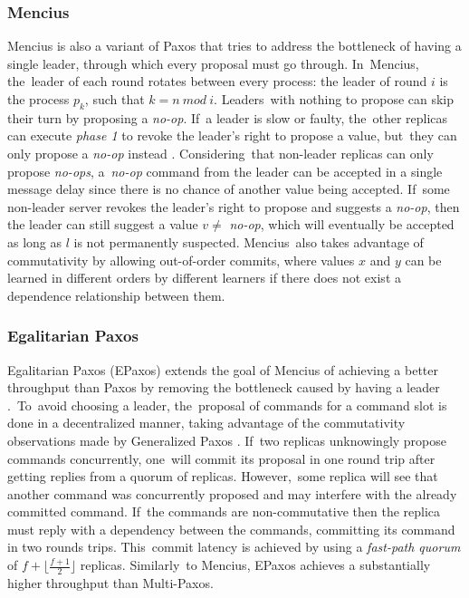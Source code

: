 \documentclass[algorithms,article,accept,moreauthors,pdftex,10pt,a4paper]{Definitions/mdpi}
\begin{document}
\subsubsection{Mencius}
Mencius is also a variant of Paxos that tries to address the bottleneck of having a single leader, through which every proposal must go through. In~Mencius, the~leader of each round rotates between every process: the leader of round $i$ is the process $p_k$, such that $k = n\ mod\ i$. Leaders~with nothing to propose can skip their turn by proposing a \textit{no-op}. If~a leader is slow or faulty, the~other replicas can execute \textit{phase 1} to revoke the leader's right to propose a value, but~they can only propose a \textit{no-op} instead \cite{Mao2008}. Considering~that non-leader replicas can only propose \textit{no-ops}, a~\textit{no-op} command from the leader can be accepted in a single message delay since there is no chance of another value being accepted. If~some non-leader server revokes the leader's right to propose and suggests a \textit{no-op}, then the leader can still suggest a value $v \neq$ \textit{no-op}, which will eventually be accepted as long as $l$ is not permanently suspected. Mencius~also takes advantage of commutativity by allowing out-of-order commits, where values $x$ and $y$ can be learned in different orders by different learners if there does not exist a dependence relationship between them.

\subsubsection{Egalitarian Paxos}
Egalitarian Paxos (EPaxos) extends the goal of Mencius of achieving a better throughput than Paxos by removing the bottleneck caused by having a leader \cite{Moraru2013}.~To~avoid choosing a leader, the~proposal of commands for a command slot is done in a decentralized manner, taking advantage of the commutativity observations made by Generalized Paxos \cite{Lamport2005}. If~two replicas unknowingly propose commands concurrently, one~will commit its proposal in one round trip after getting replies from a quorum of replicas. However,~some replica will see that another command was concurrently proposed and may interfere with the already committed command. If~the commands are non-commutative then the replica must reply with a dependency between the commands, committing its command in two rounds trips. This~commit latency is achieved by using a \textit{fast-path quorum} of $f+\lfloor\frac{f+1}{2}\rfloor$ replicas. Similarly~to Mencius, EPaxos achieves a substantially higher throughput than Multi-Paxos.
\end{document}
